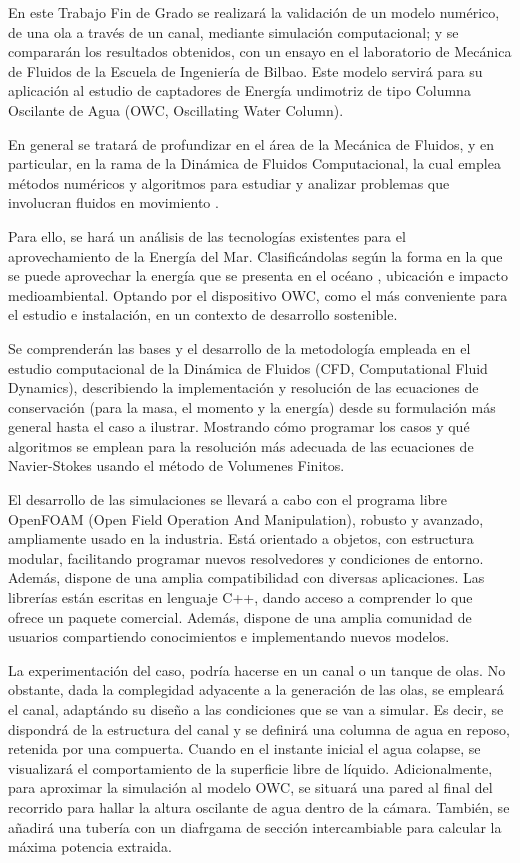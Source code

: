 En este Trabajo Fin de Grado se realizará la validación de un modelo
numérico, de una ola a través de un canal, mediante simulación
computacional; y se compararán los resultados obtenidos, con un ensayo
en el laboratorio de Mecánica de Fluidos de la Escuela de Ingeniería de
Bilbao. Este modelo servirá para su aplicación al estudio de captadores
de Energía undimotriz de tipo Columna Oscilante de Agua (OWC,
Oscillating Water Column).

En general se tratará de profundizar en el área de la Mecánica de
Fluidos, y en particular, en la rama de la Dinámica de Fluidos
Computacional, la cual emplea métodos numéricos y algoritmos para
estudiar y analizar problemas que involucran fluidos en movimiento
\cite{orrego09}.

Para ello, se hará un análisis de las tecnologías existentes para el
aprovechamiento de la Energía del Mar. Clasificándolas según la forma en
la que se puede aprovechar la energía que se presenta en el océano
\cite{amundarain12}, ubicación e impacto medioambiental. Optando por el
dispositivo OWC, como el más conveniente para el estudio e instalación,
en un contexto de desarrollo sostenible.

Se comprenderán las bases y el desarrollo de la metodología empleada en
el estudio computacional de la Dinámica de Fluidos (CFD, Computational
Fluid Dynamics), describiendo la implementación y resolución de las
ecuaciones de conservación (para la masa, el momento y la energía) desde
su formulación más general hasta el caso a ilustrar. Mostrando cómo
programar los casos y qué algoritmos se emplean para la resolución más
adecuada de las ecuaciones de Navier-Stokes usando el método de
Volumenes Finitos.

El desarrollo de las simulaciones se llevará a cabo con el programa
libre OpenFOAM (Open Field Operation And Manipulation), robusto y
avanzado, ampliamente usado en la industria. Está orientado a objetos,
con estructura modular, facilitando programar nuevos resolvedores y
condiciones de entorno. Además, dispone de una amplia compatibilidad con
diversas aplicaciones. Las librerías están escritas en lenguaje C++,
dando acceso a comprender lo que ofrece un paquete comercial. Además,
dispone de una amplia comunidad de usuarios compartiendo conocimientos e
implementando nuevos modelos.

La experimentación del caso, podría hacerse en un canal o un tanque de
olas. No obstante, dada la complegidad adyacente a la generación de las
olas, se empleará el canal, adaptándo su diseño a las condiciones que se
van a simular. Es decir, se dispondrá de la estructura del canal y se
definirá una columna de agua en reposo, retenida por una compuerta.
Cuando en el instante inicial el agua colapse, se visualizará el
comportamiento de la superficie libre de líquido. Adicionalmente, para
aproximar la simulación al modelo OWC, se situará una pared al final del
recorrido para hallar la altura oscilante de agua dentro de la cámara.
También, se añadirá una tubería con un diafrgama de sección
intercambiable para calcular la máxima potencia extraida.

